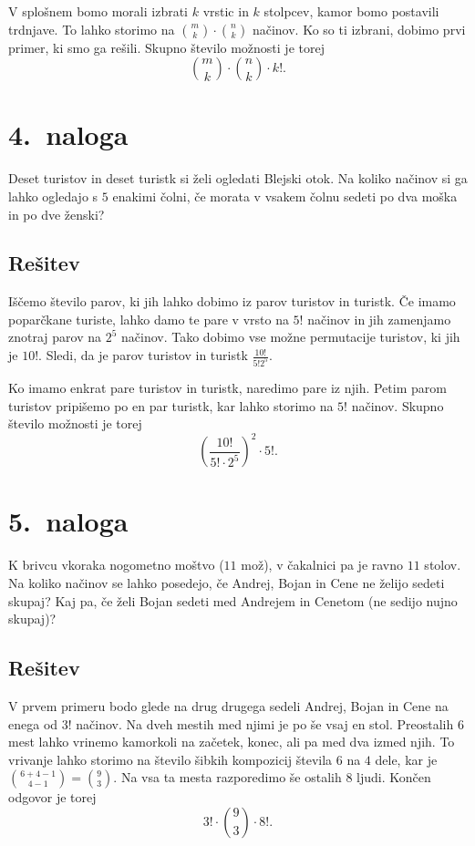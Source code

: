 \documentclass[11pt]{article}
\begin{document}
    V splošnem bomo morali izbrati \(k\) vrstic in \(k\) stolpcev, kamor bomo postavili trdnjave.
    To lahko storimo na \(\binom{m}{k} \cdot \binom{n}{k}\) načinov. Ko so ti izbrani, dobimo prvi primer, ki smo ga rešili.
    Skupno število možnosti je torej 
    \[\binom{m}{k} \cdot \binom{n}{k} \cdot k!.\]

\section*{4.~naloga}
Deset turistov in deset turistk si želi ogledati Blejski otok. Na koliko načinov si ga lahko
ogledajo s \(5\) enakimi čolni, če morata v vsakem čolnu sedeti po dva moška in po dve ženski?

\subsection*{Rešitev}
    Iščemo število parov, ki jih lahko dobimo iz parov turistov in turistk.
    Če imamo poparčkane turiste, lahko damo te pare v vrsto na \(5!\) načinov in jih zamenjamo znotraj parov na \(2^5\) načinov. 
    Tako dobimo vse možne permutacije turistov, ki jih je \(10!\). Sledi, da je parov turistov in turistk \(\frac{10!}{5!2^5}\). 

    Ko imamo enkrat pare turistov in turistk, naredimo pare iz njih. Petim parom turistov pripišemo
    po en par turistk, kar lahko storimo na \(5!\) načinov. Skupno število možnosti je torej 
    \[{\left(\frac{10!}{5! \cdot 2^5}\right)}^2 \cdot 5!.\]

\section*{5.~naloga}
K brivcu vkoraka nogometno moštvo (\(11\) mož), v čakalnici pa je ravno \(11\) stolov. Na koliko
načinov se lahko posedejo, če Andrej, Bojan in Cene ne želijo sedeti skupaj? Kaj pa, če želi
Bojan sedeti med Andrejem in Cenetom (ne sedijo nujno skupaj)?
\subsection*{Rešitev}
    V prvem primeru bodo glede na drug drugega sedeli Andrej, Bojan in Cene na enega od \(3!\) načinov.
    Na dveh mestih med njimi je po še vsaj en stol. Preostalih \(6\) mest lahko vrinemo kamorkoli na začetek, konec, 
    ali pa med dva izmed njih. To vrivanje lahko storimo na število šibkih kompozicij števila \(6\) na \(4\) dele,
    kar je \(\binom{6 + 4 - 1}{4 - 1} = \binom{9}{3}\). Na vsa ta mesta razporedimo še ostalih \(8\) ljudi. Končen odgovor je torej
    \[3! \cdot \binom{9}{3} \cdot 8!.\]
\end{document}
